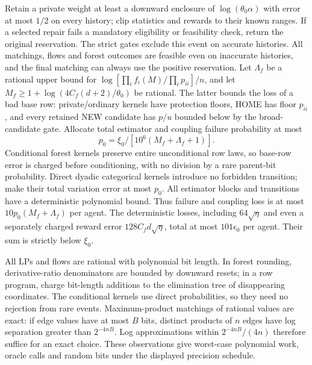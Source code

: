 Retain a private weight at least a downward enclosure of
$\log(\theta_0\alpha)$ with error at most $1/2$ on every history;
clip statistics and rewards to their known ranges. If a selected repair
fails a mandatory eligibility or feasibility check, return the original
reservation. The strict gates exclude this event on accurate histories.
All matchings, flows and forest outcomes are feasible even on inaccurate
histories, and the final matching can always use the positive reservation.
Let $\Lambda_f$ be a rational upper bound for
$\log[\prod_i f_i(M)/\prod_i p_{ii}]/n$, and let
$M_f\ge1+\log(4C_f(d+2)/\theta_0)$ be rational.
The latter bounds the loss of a bad base row: private/ordinary kernels
have protection floors, HOME has floor $p_{ii}$, and every retained NEW
candidate has $p/u$ bounded below by the broad-candidate gate.
Allocate total estimator and coupling failure probability at most
\[
 p_0=\xi_0/[10^6(M_f+\Lambda_f+1)].
\]
Conditional forest kernels preserve entire unconditional row laws, so
base-row error is charged before conditioning, with no division by a rare
parent-bit probability. Direct dyadic categorical kernels introduce no
forbidden transition; make their total variation error at most $p_0$.
All estimator blocks and transitions have a deterministic polynomial bound.
Thus failure and coupling loss is at most
$10p_0(M_f+\Lambda_f)$ per agent. The deterministic losses, including
$64\sqrt\eta$ and even a separately charged reward error
$128C_fd\sqrt\eta$, total at most $101\epsilon_0$ per agent.
Their sum is strictly below $\xi_0$.

All LPs and flows are rational with polynomial bit length. In forest
rounding, derivative-ratio denominators are bounded by downward resets;
in a row program, charge bit-length additions to the elimination tree of
disappearing coordinates. The conditional kernels use direct probabilities,
so they need no rejection from rare events. Maximum-product matchings of
rational values are exact: if edge values have at most $B$ bits, distinct
products of $n$ edges have log separation greater than $2^{-4nB}$.
Log approximations within $2^{-4nB}/(4n)$ therefore suffice for an exact
choice. These observations give worst-case polynomial work, oracle calls
and random bits under the displayed precision schedule.

